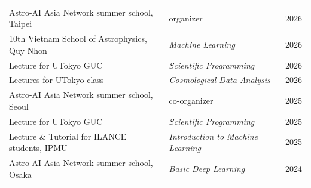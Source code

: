 \begin{tabularx}{\linewidth}{Xlr}
Astro-AI Asia Network summer school, Taipei & organizer & 2026 \\
10th Vietnam School of Astrophysics, Quy Nhon & \emph{Machine Learning} & 2026 \\
Lecture for UTokyo GUC & \emph{Scientific Programming} & 2026 \\
Lectures for UTokyo class & \emph{Cosmological Data Analysis} & 2026 \\
Astro-AI Asia Network summer school, Seoul & co-organizer & 2025 \\
Lecture for UTokyo GUC & \emph{Scientific Programming} & 2025 \\
Lecture \& Tutorial for ILANCE students, IPMU &  \emph{Introduction to Machine Learning} & 2025 \\
Astro-AI Asia Network summer school, Osaka &  \emph{Basic Deep Learning} & 2024 \\
\end{tabularx}
